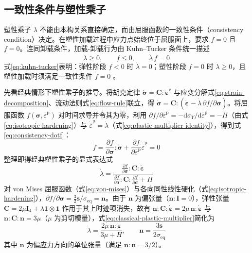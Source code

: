 \subsection{一致性条件与塑性乘子}\label{sec:plastic-consistency}

塑性乘子 $\dot{\lambda}$ 不能由本构关系直接确定，而由屈服函数的一致性条件（consistency condition）决定。在塑性加载过程中应力点始终位于屈服面上，要求 $f=0$ 且 $\dot{f}=0$。连同卸载条件，加载-卸载行为由 Kuhn–Tucker 条件统一描述
\begin{equation}
  \dot{\lambda}\ge 0,\qquad f\le 0,\qquad \dot{\lambda}\,f=0
  \label{eq:kuhn-tucker}
\end{equation}
式\eqref{eq:kuhn-tucker}表明：弹性阶段 $f<0$ 时 $\dot{\lambda}=0$；塑性阶段 $f=0$ 时 $\dot{\lambda}\ge 0$，且塑性加载时须满足一致性条件 $\dot{f}=0$ \cite{SimoHughes1998}。

先看经典情形下塑性乘子的推导。将胡克定律 $\dot{\boldsymbol{\sigma}}=\mathbf{C}:\dot{\boldsymbol{\varepsilon}}^{\mathrm{e}}$ 与应变分解式\eqref{eq:strain-decomposition}、流动法则式\eqref{eq:flow-rule}联立，得 $\dot{\boldsymbol{\sigma}}=\mathbf{C}:(\dot{\boldsymbol{\varepsilon}}-\dot{\lambda}\,\partial f/\partial\boldsymbol{\sigma})$。将屈服函数 $f(\boldsymbol{\sigma},\bar{\varepsilon}^{\mathrm{p}})$ 对时间求导并令其为零，利用 $\partial f/\partial\bar{\varepsilon}^{\mathrm{p}}=-\mathrm{d}\sigma_{Y}/\mathrm{d}\bar{\varepsilon}^{\mathrm{p}}=-H$（由式\eqref{eq:isotropic-hardening}）与 $\dot{\bar{\varepsilon}}^{\mathrm{p}}=\dot{\lambda}$（式\eqref{eq:plastic-multiplier-identity}），得到式\eqref{eq:consistency-dotf}：
\begin{equation}
  \dot{f}=\frac{\partial f}{\partial\boldsymbol{\sigma}}:\dot{\boldsymbol{\sigma}}+\frac{\partial f}{\partial\bar{\varepsilon}^{\mathrm{p}}}\dot{\bar{\varepsilon}}^{\mathrm{p}}=0
  \label{eq:consistency-dotf}
\end{equation}
整理即得经典塑性乘子的显式表达式
\begin{equation}
  \dot{\lambda}=\frac{\displaystyle\frac{\partial f}{\partial\boldsymbol{\sigma}}:\mathbf{C}:\dot{\boldsymbol{\varepsilon}}}{\displaystyle
  \frac{\partial f}{\partial\boldsymbol{\sigma}}:\mathbf{C}:\frac{\partial f}{\partial\boldsymbol{\sigma}}+H}
  \label{eq:classical-plastic-multiplier}
\end{equation}
对 von Mises 屈服函数（式\eqref{eq:von-mises}）与各向同性线性硬化（式\eqref{eq:isotropic-hardening}），$\partial f/\partial\boldsymbol{\sigma}=\tfrac{3}{2}\mathbf{s}/\sigma_{\mathrm{eq}}=\mathbf{n}$。由于 $\mathbf{n}$ 为偏张量（$\mathbf{n}:\mathbf{I}=0$），弹性张量 $\mathbf{C}=2\mu\mathbf{I}_{4}+\lambda\mathbf{1}\otimes\mathbf{1}$ 作用于其上时迹项消失，故有 $\mathbf{n}:\mathbf{C}:\dot{\boldsymbol{\varepsilon}}=2\mu\,\mathbf{n}:\dot{\boldsymbol{\varepsilon}}$ 与 $\mathbf{n}:\mathbf{C}:\mathbf{n}=3\mu$（$\mu$ 为剪切模量），式\eqref{eq:classical-plastic-multiplier}简化为
\begin{equation}
  \dot{\lambda}=\frac{2\mu\,\mathbf{n}:\dot{\boldsymbol{\varepsilon}}}{3\mu+H},\qquad
  \mathbf{n}=\frac{3\mathbf{s}}{2\sigma_{\mathrm{eq}}}
  \label{eq:j2-plastic-multiplier}
\end{equation}
其中 $\mathbf{n}$ 为偏应力方向的单位张量（满足 $\mathbf{n}:\mathbf{n}=3/2$）\cite{SimoHughes1998}。

